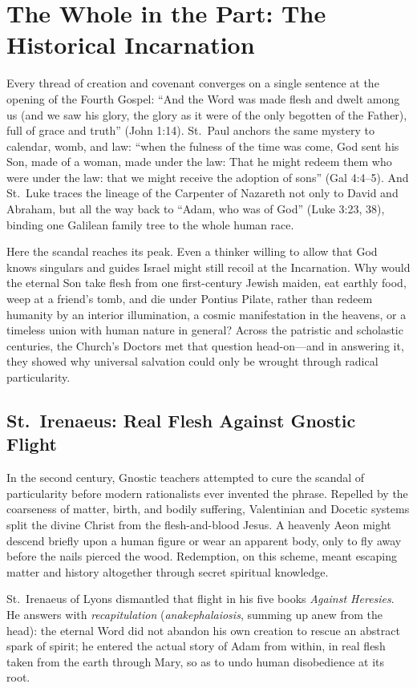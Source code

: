 \section{The Whole in the Part: The Historical Incarnation}

Every thread of creation and covenant converges on a single sentence at the opening of the Fourth Gospel: ``And the Word was made flesh and dwelt among us (and we saw his glory, the glory as it were of the only begotten of the Father), full of grace and truth'' (John 1:14). St.\ Paul anchors the same mystery to calendar, womb, and law: ``when the fulness of the time was come, God sent his Son, made of a woman, made under the law: That he might redeem them who were under the law: that we might receive the adoption of sons'' (Gal 4:4--5). And St.\ Luke traces the lineage of the Carpenter of Nazareth not only to David and Abraham, but all the way back to ``Adam, who was of God'' (Luke 3:23, 38), binding one Galilean family tree to the whole human race.

Here the scandal reaches its peak. Even a thinker willing to allow that God knows singulars and guides Israel might still recoil at the Incarnation. Why would the eternal Son take flesh from one first-century Jewish maiden, eat earthly food, weep at a friend's tomb, and die under Pontius Pilate, rather than redeem humanity by an interior illumination, a cosmic manifestation in the heavens, or a timeless union with human nature in general? Across the patristic and scholastic centuries, the Church's Doctors met that question head-on---and in answering it, they showed why universal salvation could only be wrought through radical particularity.

\subsection{St.\ Irenaeus: Real Flesh Against Gnostic Flight}

In the second century, Gnostic teachers attempted to cure the scandal of particularity before modern rationalists ever invented the phrase. Repelled by the coarseness of matter, birth, and bodily suffering, Valentinian and Docetic systems split the divine Christ from the flesh-and-blood Jesus. A heavenly Aeon might descend briefly upon a human figure or wear an apparent body, only to fly away before the nails pierced the wood. Redemption, on this scheme, meant escaping matter and history altogether through secret spiritual knowledge.

St.\ Irenaeus of Lyons dismantled that flight in his five books \textit{Against Heresies}. He answers with \textit{recapitulation} (\textit{anakephalaiosis}, summing up anew from the head): the eternal Word did not abandon his own creation to rescue an abstract spark of spirit; he entered the actual story of Adam from within, in real flesh taken from the earth through Mary, so as to undo human disobedience at its root.

